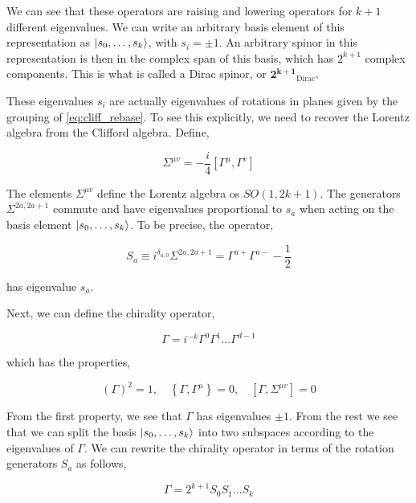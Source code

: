 We can see that these operators are raising and lowering operators for $k+1$ different eigenvalues. We can write an arbitrary basis element of this representation as $\lvert s_0, \dots, s_{k}\rangle$, with $s_i = \pm 1$. An arbitrary spinor in this representation is then in the complex span of this basis, which has $2^{k+1}$ complex components. This is what is called a Dirac spinor, or $\mathbf{2^{k+1}}_{\text{Dirac}}$.

These eigenvalues $s_i$ are actually eigenvalues of rotations in planes given by the grouping of \ref{eq:cliff_rebase}. To see this explicitly, we need to recover the Lorentz algebra from the Clifford algebra. Define,

\begin{equation}
    \Sigma^{\mu v}=-\frac{i}{4}\left[\Gamma^\mu, \Gamma^v\right]
\end{equation}

The elements $\Sigma^{\mu v}$ define the Lorentz algebra os $SO(1, 2k+1)$. The generators $\Sigma^{2a,2a+1}$ commute and have eigenvalues proportional to $s_a$ when acting on the basis element $\lvert s_0, \dots, s_{k}\rangle$. To be precise, the operator,

\begin{equation}
    S_a \equiv i^{\delta_{a, 0}} \Sigma^{2 a, 2 a+1}=\Gamma^{a+} \Gamma^{a-}-\frac{1}{2}
\end{equation}

has eigenvalue $s_a$.

Next, we can define the chirality operator,

\begin{equation}
    \label{eq:chirality_op}
    \Gamma=i^{-k} \Gamma^0 \Gamma^1 \ldots \Gamma^{d-1}
\end{equation}

which has the properties,

\begin{equation}
    (\Gamma)^2=1, \quad\left\{\Gamma, \Gamma^\mu\right\}=0, \quad\left[\Gamma, \Sigma^{\mu v}\right]=0
\end{equation}

From the first property, we see that $\Gamma$ has eigenvalues $\pm 1$. From the rest we see that we can split the basis $\lvert s_0,\dots,s_k\rangle$ into two subspaces according to the eigenvalues of $\Gamma$. We can rewrite the chirality operator in terms of the rotation generators $S_a$ as follows,

\begin{equation}
    \Gamma=2^{k+1} S_0 S_1 \ldots S_k
\end{equation}

